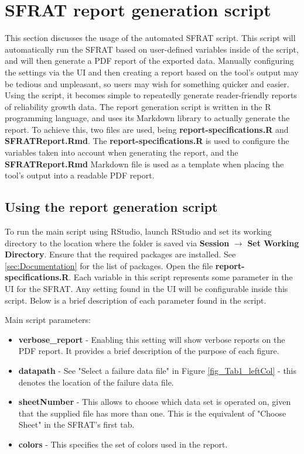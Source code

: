 \documentclass[conference]{IEEEtran}
\begin{document}
\section{SFRAT report generation script}\label{sec:Script}
This section discusses the usage of the automated SFRAT script. This script will automatically run the SFRAT based on user-defined variables inside of the script, and will then generate a PDF report of the exported data. Manually configuring the settings via the UI and then creating a report based on the tool's output may be tedious and unpleasant, so users may wish for something quicker and easier. Using the script, it becomes simple to repeatedly generate reader-friendly reports of reliability growth data. The report generation script is written in the R programming language, and uses its Markdown library to actually generate the report. To achieve this, two files are used, being \textbf{report-specifications.R} and
\textbf{SFRATReport.Rmd}. The \textbf{report-specifications.R} is used to configure the variables taken into account when generating the report, and the \textbf{SFRATReport.Rmd} Markdown file is used as a template when placing the tool's output into a readable PDF report.

\subsection{Using the report generation script}\label{sec:ScriptRun}
To run the main script using RStudio, launch RStudio and set its working directory to the location where the folder is saved via \textbf{Session} $\to$ \textbf{Set Working Directory}. Ensure that the required packages are installed. See \ref{sec:Documentation} for the list of packages. Open the file \textbf{report-specifications.R}. Each variable in this script represents some parameter in the UI for the SFRAT. Any setting found in the UI will be configurable inside this script. Below is a brief description of each parameter found in the script.
  
\noindent Main script parameters:
    \begin{itemize}
    \item {\textbf{verbose\_report} - Enabling this setting will show verbose reports on the PDF report. It provides a brief description of the purpose of each figure.}
      \item {\textbf{datapath} - See "Select a failure data file" in Figure \ref{fig_Tab1_leftCol} - this denotes the location of the failure data file.}
      \item {\textbf{sheetNumber} - This allows to choose which data set is operated on, given that the supplied file has more than one. This is the equivalent of "Choose Sheet" in the SFRAT's first tab.}
      \item {\textbf{colors} - This specifies the set of colors used in the report.}
    \end{itemize}
\end{document}

